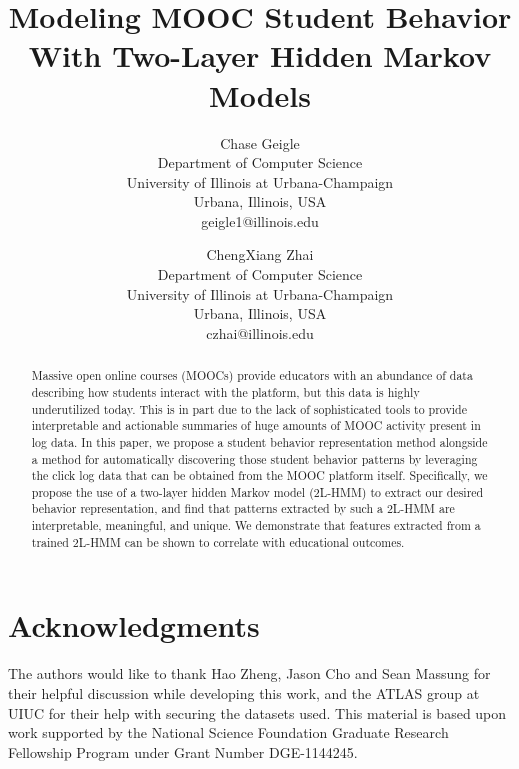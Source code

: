 \documentclass[a4,notitlepage,12pt]{jedm}
\begin{document}
\title{Modeling MOOC Student Behavior With Two-Layer Hidden Markov Models}

\author{%
  {\large Chase Geigle}\\Department of Computer Science\\University
  of Illinois at Urbana-Champaign\\Urbana, Illinois,
  USA\\geigle1@illinois.edu
  \and
  {\large ChengXiang Zhai}\\Department of Computer Science\\University of
  Illinois at Urbana-Champaign\\Urbana, Illinois, USA\\czhai@illinois.edu}

\maketitle

\begin{abstract}
  Massive open online courses (MOOCs) provide educators with an abundance
  of data describing how students interact with the platform, but this data
  is highly underutilized today. This is in part due to the lack of
  sophisticated tools to provide interpretable and actionable summaries of
  huge amounts of MOOC activity present in log data. In this paper, we
  propose a student behavior representation method alongside a method for
  automatically discovering those student behavior patterns by leveraging
  the click log data that can be obtained from the MOOC platform itself.
  Specifically, we propose the use of a two-layer hidden Markov model
  (2L-HMM) to extract our desired behavior representation, and find that
  patterns extracted by such a 2L-HMM are interpretable, meaningful, and
  unique. We demonstrate that features extracted from a trained 2L-HMM can
  be shown to correlate with educational outcomes.
\end{abstract}

\newcommand{\NSFGRFP}{This material is based upon work supported by the
National Science Foundation Graduate Research Fellowship Program under
Grant Number DGE-1144245.}

\newcommand{\acknowledgments}{The authors would like to thank Hao Zheng,
Jason Cho and Sean Massung for their helpful discussion while developing
this work, and the ATLAS group at UIUC for their help with securing the
datasets used. \NSFGRFP{}}













\section{Acknowledgments}
\acknowledgments{}



\end{document}
